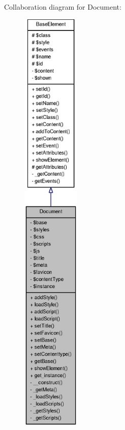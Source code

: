 Collaboration diagram for Document:
\nopagebreak
\begin{figure}[H]
\begin{center}
\leavevmode
\includegraphics[height=600pt]{classDocument__coll__graph}
\end{center}
\end{figure}
